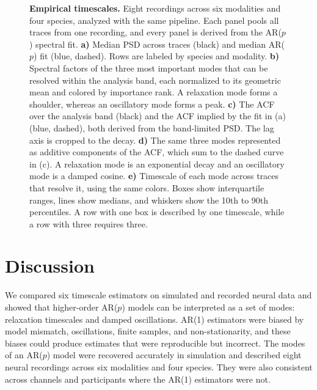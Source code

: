 \documentclass[pdflatex,sn-mathphys-num]{sn-jnl}
\begin{document}
\begin{figure}[htbp]
\centering

\caption{\textbf{Empirical timescales.} Eight recordings across six modalities and four species, analyzed with the same pipeline. Each panel pools all traces from one recording, and every panel is derived from the AR($p$) spectral fit. \textbf{a)} Median PSD across traces (black) and median AR($p$) fit (blue, dashed). Rows are labeled by species and modality. \textbf{b)} Spectral factors of the three most important modes that can be resolved within the analysis band, each normalized to its geometric mean and colored by importance rank. A relaxation mode forms a shoulder, whereas an oscillatory mode forms a peak. \textbf{c)} The ACF over the analysis band (black) and the ACF implied by the fit in (a) (blue, dashed), both derived from the band-limited PSD. The lag axis is cropped to the decay. \textbf{d)} The same three modes represented as additive components of the ACF, which sum to the dashed curve in (c). A relaxation mode is an exponential decay and an oscillatory mode is a damped cosine. \textbf{e)} Timescale of each mode across traces that resolve it, using the same colors. Boxes show interquartile ranges, lines show medians, and whiskers show the 10th to 90th percentiles. A row with one box is described by one timescale, while a row with three requires three.}
\label{fig:realdata}
\end{figure}

\section{Discussion}\label{sec:discussion}

We compared six timescale estimators on simulated and recorded neural data and showed that higher-order AR($p$) models can be interpreted as a set of modes: relaxation timescales and damped oscillations. AR(1) estimators were biased by model mismatch, oscillations, finite samples, and non-stationarity, and these biases could produce estimates that were reproducible but incorrect. The modes of an AR($p$) model were recovered accurately in simulation and described eight neural recordings across six modalities and four species. They were also consistent across channels and participants where the AR(1) estimators were not.
\end{document}
